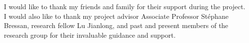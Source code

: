 \documentclass[fyp,12pt]{socreport}
\theoremstyle{definition}
\theoremstyle{plain}
\begin{document}
\begin{acknowledgement}
I would like to thank my friends and family for their support during the project. I would also like to thank my project advisor Associate Professor St\'ephane Bressan, research fellow Lu Jianlong, and past and present members of the research group for their invaluable guidance and support.
\end{acknowledgement}

\listoffigures %
\listoftables %
\tableofcontents












\appendix





\end{document}
